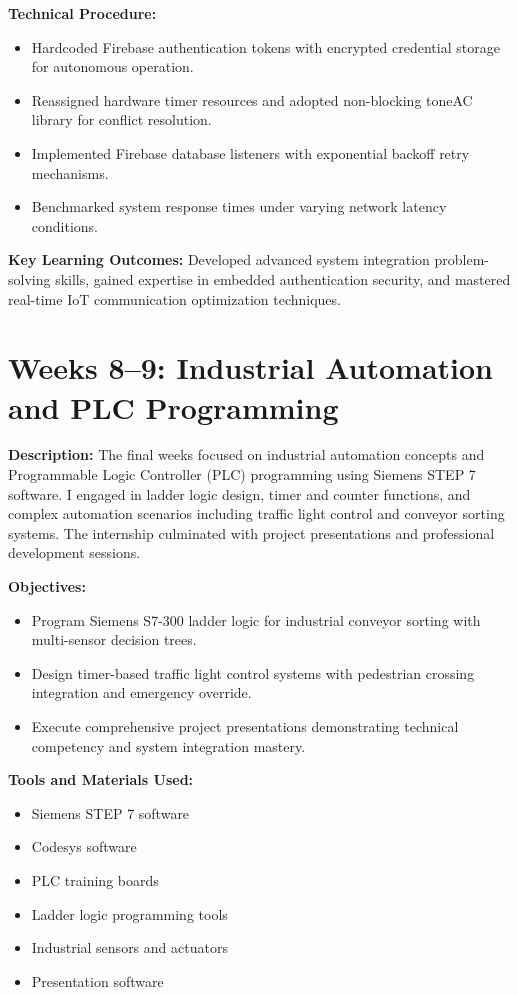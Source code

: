 \documentclass[12pt,a4paper]{report}
\begin{document}
\noindent\textbf{Technical Procedure:}
\begin{itemize}
    \item Hardcoded Firebase authentication tokens with encrypted credential storage for autonomous operation.
    \item Reassigned hardware timer resources and adopted non-blocking toneAC library for conflict resolution.
    \item Implemented Firebase database listeners with exponential backoff retry mechanisms.
    \item Benchmarked system response times under varying network latency conditions.
\end{itemize}

\noindent\textbf{Key Learning Outcomes:} Developed advanced system integration problem-solving skills, gained expertise in embedded authentication security, and mastered real-time IoT communication optimization techniques.

\section{Weeks 8--9: Industrial Automation and PLC Programming}

\noindent\textbf{Description:} The final weeks focused on industrial automation concepts and Programmable Logic Controller (PLC) programming using Siemens STEP 7 software. I engaged in ladder logic design, timer and counter functions, and complex automation scenarios including traffic light control and conveyor sorting systems. The internship culminated with project presentations and professional development sessions.

\noindent\textbf{Objectives:}
\begin{itemize}
    \item Program Siemens S7-300 ladder logic for industrial conveyor sorting with multi-sensor decision trees.
    \item Design timer-based traffic light control systems with pedestrian crossing integration and emergency override.
    \item Execute comprehensive project presentations demonstrating technical competency and system integration mastery.
\end{itemize}

\noindent\textbf{Tools and Materials Used:}
\begin{multicols}{2}
\begin{itemize}
    \item Siemens STEP 7 software
    \item Codesys software
    \item PLC training boards
    \item Ladder logic programming tools
    \item Industrial sensors and actuators
    \item Presentation software
\end{itemize}
\end{multicols}
\end{document}
